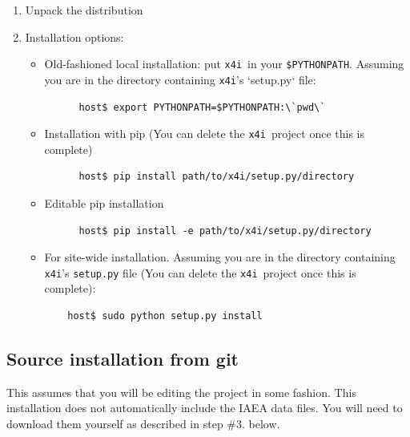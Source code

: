 \documentclass[11pt]{article}
\newcommand{\xfouri}{\texttt{x4i}}
\begin{document}
\begin{enumerate}
\item Unpack the distribution

\item Installation options:
  \begin{itemize}
  \item Old-fashioned local installation: put \xfouri\ in your \texttt{\$PYTHONPATH}.  Assuming you are in the directory containing \xfouri's `setup.py` file:
    \begin{verbatim}
      host$ export PYTHONPATH=$PYTHONPATH:\`pwd\`
    \end{verbatim}

  \item Installation with pip (You can delete the \xfouri\ project once this is complete)
    \begin{verbatim}
      host$ pip install path/to/x4i/setup.py/directory
    \end{verbatim}

  \item Editable pip installation
    \begin{verbatim}
      host$ pip install -e path/to/x4i/setup.py/directory
    \end{verbatim}

  \item For site-wide installation.  Assuming you are in the directory containing \xfouri's \texttt{setup.py} file (You can delete the \xfouri\ project once this is complete):
    \begin{verbatim}
    host$ sudo python setup.py install
    \end{verbatim}

  \end{itemize}

\end{enumerate}

\subsection{Source installation from git}

This assumes that you will be editing the project in some fashion.  
This installation does not automatically include the IAEA data files.  
You will need to download them yourself as described in step \#3. below.
\end{document}

